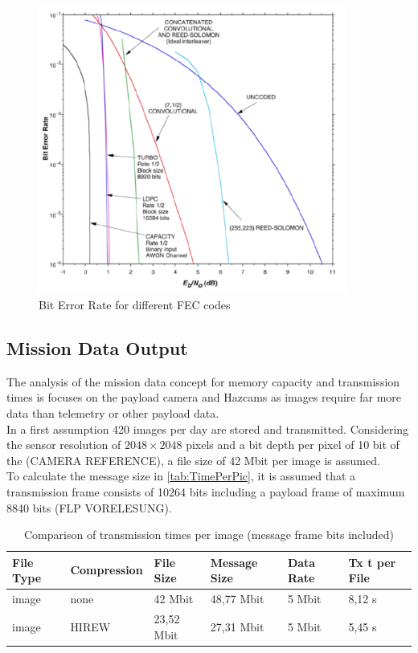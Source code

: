 \begin{figure}[h]
	\centering
  		\includegraphics[width=0.9\textwidth]{Media/Bit_Error_Rate.png}
  \caption{Bit Error Rate for different FEC codes}
  \label{fig:BitErrorRate}
\end{figure}

\subsection{Mission Data Output}
\label{app:MissionDataOutput}

The analysis of the mission data concept for memory capacity and transmission times is focuses on the payload camera and Hazcams as images require far more data than telemetry or other payload data. \\

In a first assumption 420 images per day are stored and transmitted. Considering the sensor resolution of $2048\times2048$ pixels and a bit depth per pixel of 10 bit of the (CAMERA REFERENCE), a file size of 42 Mbit per image is assumed.\\
To calculate the message size in \autoref{tab:TimePerPic}, it is assumed that a transmission frame consists of 10264 bits including a payload frame of maximum 8840 bits (FLP VORELESUNG).   

\begin{table}[h]
\centering
\begin{tabular}{llllll}
File Type & Compression    & File Size  & Message Size & Data Rate & Tx t per File \\ \hline\hline
image     & none           & 42 Mbit    & 48,77 Mbit   & 5 Mbit    & 8,12 s        \\
image     & HIREW          & 23,52 Mbit & 27,31 Mbit   & 5 Mbit    & 5,45 s        \\ \hline
\end{tabular}
\caption{Comparison of transmission times per image (message frame bits included)}
\label{tab:TimePerPic}
\end{table}


